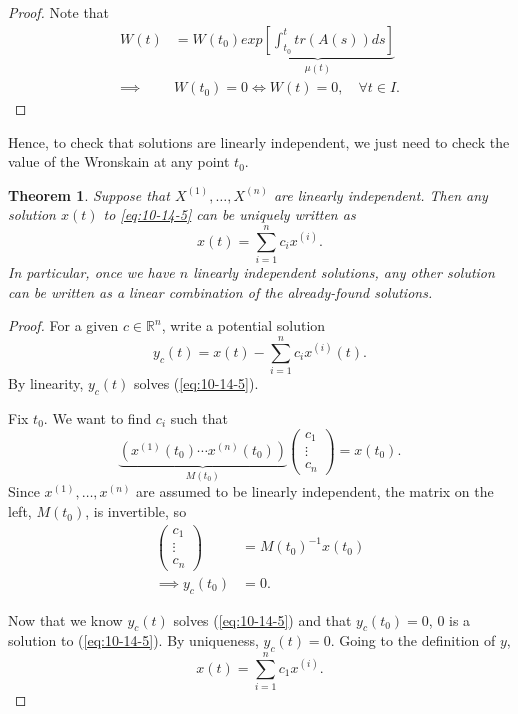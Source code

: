 \documentclass{tufte-handout}
\newcommand*\R{\mathbb{R}}
\newtheorem{thm}{Theorem}[subsection]
\theoremstyle{definition}
\begin{document}
\begin{proof}
	Note that
	\begin{align*}
		W(t) &= W(t_0) \underbrace{exp\left[ \int_{t_0}^{t} tr(A(s))ds\right]}_{\mu(t)}   \\
		\implies &W(t_0) = 0 \iff W(t) = 0,\quad \forall t \in I
	.\end{align*}
\end{proof}

Hence, to check that solutions are linearly independent, we just need to check the value of the Wronskain at any point $t_0$.

\begin{thm}
	Suppose that $X^{(1)},\ldots,X^{(n)}$ are linearly independent. Then any solution $x(t)$ to \ref{eq:10-14-5} can be uniquely written as \[
		x(t) = \sum\limits_{i=1}^{n} c_i x^{(i)}
	.\] In particular, once we have $n$ linearly independent solutions, any other solution can be written as a linear combination of the already-found solutions.
\end{thm}

\begin{proof}
	For a given $c \in \R^n$, write a potential solution \[
		y_c(t) = x(t) - \sum\limits_{i=1}^{n} c_i x^{(i)}(t)
	.\] By linearity, $y_c(t)$ solves (\ref{eq:10-14-5}).

	Fix $t_0$. We want to find $c_i$ such that \[
		\underbrace{(x^{(1)}(t_0) \cdots x^{(n)}(t_0))}_{M(t_0)} \begin{pmatrix}
		c_1 \\
		\vdots \\
		c_n
\end{pmatrix}  = x(t_0)
	.\] Since $x^{(1)},\ldots,x^{(n)}$ are assumed to be linearly independent, the matrix on the left, $M(t_0)$, is invertible, so  
	\begin{align*}
		\begin{pmatrix}
		c_1 \\
		\vdots \\
		c_n
		\end{pmatrix} &= M(t_0)^{-1} x(t_0) \\
		\implies y_c(t_0) &= 0
	.\end{align*}

	Now that we know $y_c(t)$ solves (\ref{eq:10-14-5}) and that $y_c(t_0) = 0$, $0$ is a solution to (\ref{eq:10-14-5}). By uniqueness, $y_c(t) = 0$. Going to the definition of $y$, \[
		x(t) = \sum\limits_{i=1}^{n} c_1 x^{(i)}
	.\] 
\end{proof}
\end{document}
